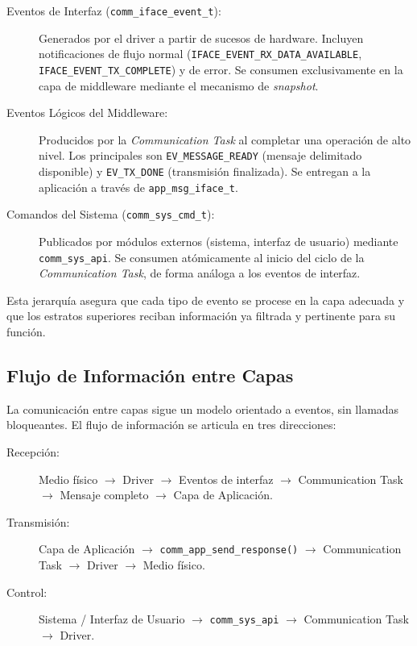\begin{description}
    \item[Eventos de Interfaz (\texttt{comm\_iface\_event\_t}):] Generados por el driver a partir de sucesos de hardware. Incluyen notificaciones de flujo normal (\texttt{IFACE\_EVENT\_RX\_DATA\_AVAILABLE},
          \texttt{IFACE\_EVENT\_TX\_COMPLETE}) y de error. Se consumen exclusivamente en la capa de middleware mediante el mecanismo de \textit{snapshot}.
    \item[Eventos Lógicos del Middleware:] Producidos por la \textit{Communication Task} al completar una operación de alto nivel. Los principales son \texttt{EV\_MESSAGE\_READY} (mensaje delimitado
          disponible) y \texttt{EV\_TX\_DONE} (transmisión finalizada). Se entregan a la aplicación a través de \texttt{app\_msg\_iface\_t}.
    \item[Comandos del Sistema (\texttt{comm\_sys\_cmd\_t}):] Publicados por módulos externos (sistema, interfaz de usuario) mediante \texttt{comm\_sys\_api}. Se consumen atómicamente al inicio del ciclo
          de la \textit{Communication Task}, de forma análoga a los eventos de interfaz.
\end{description}

Esta jerarquía asegura que cada tipo de evento se procese en la capa adecuada y que los estratos superiores reciban información ya filtrada y pertinente para su función.

\subsection{Flujo de Información entre Capas}
\label{subsec:flujo-informacion}

La comunicación entre capas sigue un modelo orientado a eventos, sin llamadas bloqueantes. El flujo de información se articula en tres direcciones:

\begin{description}
    \item[Recepción:] Medio físico $\rightarrow$ Driver $\rightarrow$ Eventos de interfaz $\rightarrow$ Communication Task $\rightarrow$ Mensaje completo $\rightarrow$ Capa de Aplicación.
    \item[Transmisión:] Capa de Aplicación $\rightarrow$ \texttt{comm\_app\_send\_response()} $\rightarrow$ Communication Task $\rightarrow$ Driver $\rightarrow$ Medio físico.
    \item[Control:] Sistema / Interfaz de Usuario $\rightarrow$ \texttt{comm\_sys\_api} $\rightarrow$ Communication Task $\rightarrow$ Driver.
\end{description}

